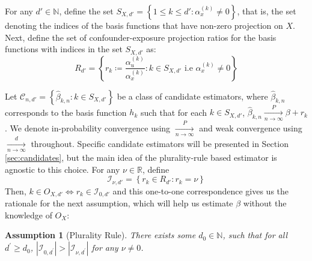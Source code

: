 \documentclass[
  12pt]{article}
\newcommand{\pnlim}{\xrightarrow[n \to \infty]{P}}
\newcommand{\dnlim}{\xrightarrow[n \to \infty]{d}}
\newcommand{\calC}{\mathcal{C}}
\newcommand{\calI}{\mathcal{I}}
\newcommand{\N}{\mathbb{N}}
\newtheorem{assumption}{Assumption}
\begin{document}
For any $d' \in \mathbb N$, define the set $S_{X,d'} = \left\{1\leq k \leq d': \alpha^{(k)}_x \neq 0\right\}$, that is, the set denoting the indices of the basis functions that have non-zero projection on $X$.  Next, define the set of confounder-exposure projection ratios for the basis functions with indices in the set $S_{X,d'}$ as:
 \begin{equation}\label{eq:ratio}
        R_{d'} = \left\{r_{k}\coloneqq \dfrac{\alpha_u^{(k)}}{\alpha_x^{(k)}}: k \in S_{X,d'} \text{ i.e } \alpha_x^{(k)} \neq 0\right\}
\end{equation}

Let $\calC_{n,d'} = \left\{\hat{\beta}_{k,n}: k \in S_{X,d'}\right\}$ be a class of candidate estimators, where $\hat{\beta}_{k,n}$ corresponds to the basis function $h_k$ such that for each $k\in S_{X,d'}$, $\hat{\beta}_{k,n} \pnlim \beta+r_{k}$. We denote in-probability convergence using $\pnlim$ and weak convergence using $\dnlim$ throughout. Specific candidate estimators will be presented in Section \ref{sec:candidates}, but the main idea of the plurality-rule based estimator is agnostic to this choice. For any $\nu \in \mathbb R$, define
\begin{equation}\label{eq:ratio-value}
    \calI_{\nu,d'} = \left\{r_{k} \in R_{d'}: r_{k} = \nu\right\}
\end{equation}
Then, $k \in O_{X,d'} \iff r_{k} \in \calI_{0,d'}$ and this one-to-one correspondence gives us the rationale for the next assumption, which will help us estimate $\beta$ without the knowledge of $O_X$:
\begin{assumption}[Plurality Rule]\label{asm:estimate}  
    There exists some $d_0\in \N$, such that for all $d^\prime \geq d_0$, $\left|\calI_{0,d^\prime}\right| > \left|\calI_{\nu,d^\prime}\right|$ for any $\nu \neq 0$.
\end{assumption}
\end{document}
